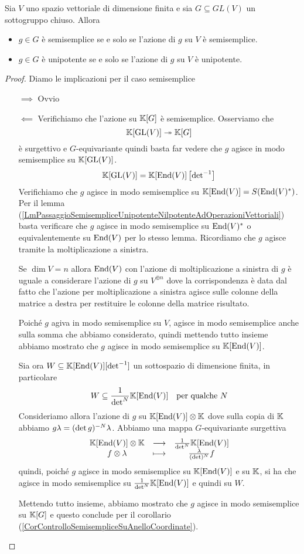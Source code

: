 \begin{lemma}\label{LmCriterioSemisempliceUnipotentePerGruppiLineari} Sia $V$ uno spazio vettoriale di dimensione finita e sia $G\subseteq GL(V)$ un sottogruppo chiuso. Allora
\begin{itemize}
    \item $g\in G$ \`e semisemplice se e solo se l'azione di $g$ su $V$ \`e semisemplice.
    \item $g\in G$ \`e unipotente se e solo se l'azione di $g$ su $V$ \`e unipotente.
\end{itemize}
\end{lemma}
\begin{proof}
Diamo le implicazioni per il caso semisemplice
\setlength{\leftmargini}{0cm}
\begin{itemize}
\item[$\boxed{\implies}$] Ovvio
\item[$\boxed{\impliedby}$] Verifichiamo che l'azione su $\mathbb{K}[G]$ \`e semisemplice. Osserviamo che 
\[\mathbb{K}[\operatorname{GL}(V)]\twoheadrightarrow \mathbb{K}[G]\]
\`e surgettivo e $G$-equivariante quindi basta far vedere che $g$ agisce in modo semisemplice su $\mathbb{K}[\operatorname{GL}(V)]$.
\[\mathbb{K}[\operatorname{GL}(V)]=\mathbb{K}[\operatorname{End}(V)]\left[{{{\det}^{-1}}}\right]\]
Verifichiamo che $g$ agisce in modo semisemplice su $\mathbb{K}[\operatorname{End}(V)]=S(\operatorname{End}(V)^\ast)$. Per il lemma (\ref{LmPassaggioSemisempliceUnipotenteNilpotenteAdOperazioniVettoriali}) basta verificare che $g$ agisce in modo semisemplice su $\operatorname{End}(V)^\ast$ o equivalentemente su $\operatorname{End}(V)$ per lo stesso lemma. Ricordiamo che $g$ agisce tramite la moltiplicazione a sinistra.

Se $\dim V=n$ allora $\operatorname{End}(V)$ con l'azione di moltiplicazione a sinistra di $g$ \`e uguale a considerare l'azione di $g$ su $V^{\oplus n}$ dove la corrispondenza \`e data dal fatto che l'azione per moltiplicazione a sinistra agisce sulle colonne della matrice a destra per restituire le colonne della matrice risultato.

Poich\'e $g$ agiva in modo semisemplice su $V$, agisce in modo semisemplice anche sulla somma che abbiamo considerato, quindi mettendo tutto insieme abbiamo mostrato che $g$ agisce in modo semisemplice su $\mathbb{K}[\operatorname{End}(V)]$.

Sia ora $W\subseteq \mathbb{K}[\operatorname{End}(V)][{\det}^{-1}]$ un sottospazio di dimensione finita, in particolare
\[W\subseteq \frac1{{\det}^N}\mathbb{K}[\operatorname{End}(V)]\quad \text{per qualche }N\]
Consideriamo allora l'azione di $g$ su $\mathbb{K}[\operatorname{End}(V)]\otimes \mathbb{K}$ dove sulla copia di $\mathbb{K}$ abbiamo $g\lambda=(\det g)^{-N}\lambda$. Abbiamo una mappa $G$-equivariante surgettiva
\[\begin{array}{ccc} {\mathbb{K}[\operatorname{End}(V)]\otimes \mathbb{K}} & \longrightarrow & {\frac1{{\det}^N}\mathbb{K}[\operatorname{End}(V)]}\\ {f\otimes \lambda} & \longmapsto & {\frac{\lambda}{(\det)^N}f} \end{array}\]
quindi, poich\'e $g$ agisce in modo semisemplice su $\mathbb{K}[\operatorname{End}(V)]$ e su $\mathbb{K}$, si ha che agisce in modo semisemplice su $\frac1{{\det}^N}\mathbb{K}[\operatorname{End}(V)]$ e quindi su $W$.


Mettendo tutto insieme, abbiamo mostrato che $g$ agisce in modo semisemplice su $\mathbb{K}[G]$ e questo conclude per il corollario (\ref{CorControlloSemisempliceSuAnelloCoordinate}).
\end{itemize}
\setlength{\leftmargini}{0.5cm}
\end{proof}
